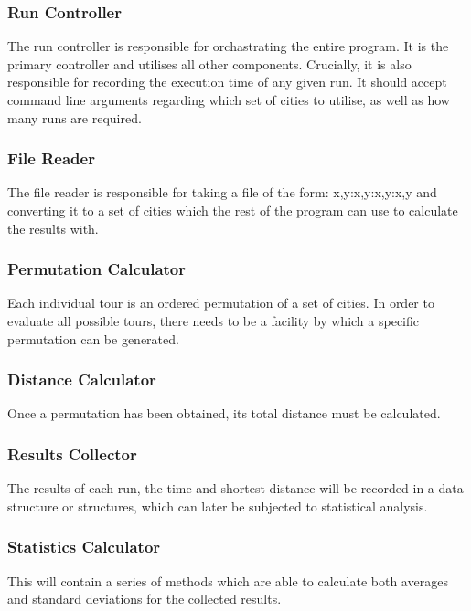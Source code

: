 \documentclass[12pt,a4paper]{article}
\begin{document}
\subsubsection{Run Controller}

The run controller is responsible for orchastrating the entire program. It is the primary controller and utilises all other components. Crucially, it is also responsible for recording the execution time of any given run. It should accept command line arguments regarding which set of cities to utilise, as well as how many runs are required.

\subsubsection{File Reader}

The file reader is responsible for taking a file of the form: x,y:x,y:x,y:x,y and converting it to a set of cities which the rest of the program can use to calculate the results with.

\subsubsection{Permutation Calculator}

Each individual tour is an ordered permutation of a set of cities. In order to evaluate all possible tours, there needs to be a facility by which a specific permutation can be generated.

\subsubsection{Distance Calculator}

Once a permutation has been obtained, its total distance must be calculated.

\subsubsection{Results Collector}

The results of each run, the time and shortest distance will be recorded in a data structure or structures, which can later be subjected to statistical analysis.

\subsubsection{Statistics Calculator}

This will contain a series of methods which are able to calculate both averages and standard deviations for the collected results.
\end{document}
